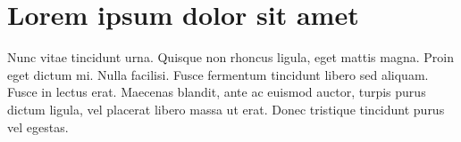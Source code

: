 \section{Lorem ipsum dolor sit amet}\label{sec:LABEL_CHP_1_SEC_J}
Nunc vitae tincidunt urna. Quisque non rhoncus ligula, eget mattis magna. Proin eget dictum mi. Nulla facilisi. Fusce fermentum tincidunt libero sed aliquam. Fusce in lectus erat. Maecenas blandit, ante ac euismod auctor, turpis purus dictum ligula, vel placerat libero massa ut erat. Donec tristique tincidunt purus vel egestas.